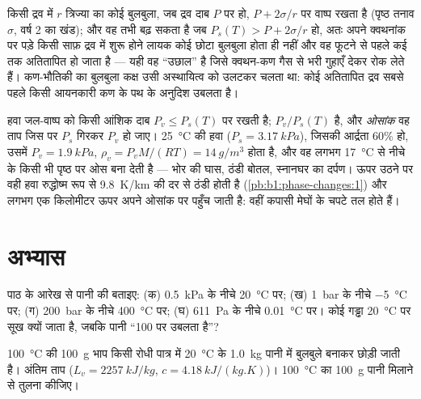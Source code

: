\begin{remark}[क्वथन-कण और बुलबुला कक्ष]\label{rem:b1:phase-changes:nucleation}
किसी द्रव में $r$ त्रिज्या का कोई बुलबुला, जब द्रव दाब $P$ पर हो,
$P + 2\sigma/r$ पर वाष्प रखता है (पृष्ठ तनाव $\sigma$, वर्ष 2 का खंड); और
वह तभी बढ़ सकता है जब $P_s(T) > P + 2\sigma/r$ हो, अतः अपने क्वथनांक पर पड़े
किसी साफ़ द्रव में शुरू होने लायक कोई छोटा बुलबुला होता ही नहीं और वह
फूटने से पहले कई  तक अतितापित हो जाता है --- यही वह ``उछाल'' है जिसे
क्वथन-कण गैस से भरी गुहाएँ देकर रोक लेते हैं। कण-भौतिकी का बुलबुला कक्ष
उसी अस्थायित्व को उलटकर चलता था: कोई अतितापित द्रव सबसे पहले किसी आयनकारी
कण के पथ के अनुदिश उबलता है।
\end{remark}

\begin{example}[आर्द्रता और ओस]\label{ex:b1:phase-changes:dew}
हवा जल-वाष्प को किसी आंशिक दाब $P_v \leq P_s(T)$ पर रखती है;
\emph{} $P_v/P_s(T)$ है, और \emph{ओसांक} वह ताप जिस पर
$P_s$ गिरकर $P_v$ हो जाए। \qty{25}{\degreeCelsius} की हवा
($P_s = \qty{3.17}{kPa}$), जिसकी आर्द्रता $60\%$ हो, उसमें $P_v = \qty{1.9}{kPa}$,
$\rho_v = P_vM/(RT) = \qty{14}{g/m^3}$ होता है, और वह लगभग
\qty{17}{\degreeCelsius} से नीचे के किसी भी पृष्ठ पर ओस बना देती है ---
भोर की घास, ठंडी बोतल, स्नानघर का दर्पण। ऊपर उठने पर वही हवा रुद्धोष्म रूप
से \qty{9.8}{K/km} की दर से ठंडी होती है (\cref{pb:b1:phase-changes:1}) और
लगभग एक किलोमीटर ऊपर अपने ओसांक पर पहुँच जाती है: वहीं कपासी मेघों के चपटे
तल होते हैं।
\end{example}

\section{अभ्यास}

\begin{exercise}[$\star$]\label{exo:b1:phase-changes:1}
पाठ के आरेख से पानी की  बताइए: (क)
\qty{0.5}{kPa} के नीचे \qty{20}{\degreeCelsius} पर; (ख) \qty{1}{bar} के
नीचे \qty{-5}{\degreeCelsius} पर; (ग) \qty{200}{bar} के नीचे
\qty{400}{\degreeCelsius} पर; (घ) \qty{611}{Pa} के नीचे
\qty{0.01}{\degreeCelsius} पर। कोई गड्ढा \qty{20}{\degreeCelsius} पर सूख
क्यों जाता है, जबकि पानी ``100 पर उबलता है''?
\end{exercise}

\begin{exercise}[$\star$]\label{exo:b1:phase-changes:2}
\qty{100}{\degreeCelsius} की \qty{100}{g} भाप किसी रोधी पात्र में
\qty{20}{\degreeCelsius} के \qty{1.0}{kg} पानी में बुलबुले बनाकर छोड़ी जाती
है। अंतिम ताप ($L_v = \qty{2257}{kJ/kg}$, $c = \qty{4.18}{kJ/(kg.K)}$)।
\qty{100}{\degreeCelsius} का \qty{100}{g} पानी मिलाने से तुलना कीजिए।
\end{exercise}

